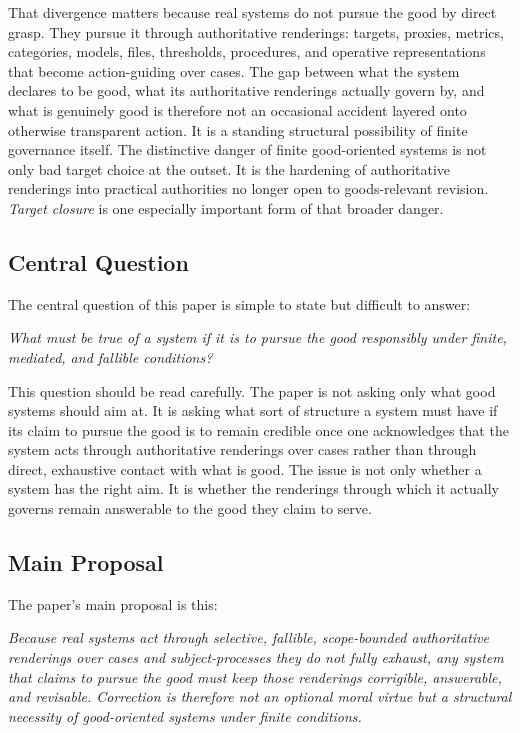 \documentclass[11pt]{article}
\renewenvironment{quote}
  {\list{}{\leftmargin=1.4em \rightmargin=1.0em}%
   \item\relax\color{softink}\itshape}
  {\endlist}
\renewcommand{\emph}[1]{\textit{#1}}
\begin{document}
That divergence matters because real systems do not pursue the good by direct grasp. They pursue it through authoritative renderings: targets, proxies, metrics, categories, models, files, thresholds, procedures, and operative representations that become action-guiding over cases. The gap between what the system declares to be good, what its authoritative renderings actually govern by, and what is genuinely good is therefore not an occasional accident layered onto otherwise transparent action. It is a standing structural possibility of finite governance itself. The distinctive danger of finite good-oriented systems is not only bad target choice at the outset. It is the hardening of authoritative renderings into practical authorities no longer open to goods-relevant revision. \emph{Target closure} is one especially important form of that broader danger.

\subsection{Central Question}

The central question of this paper is simple to state but difficult to answer:

\begin{quote}
What must be true of a system if it is to pursue the good responsibly under finite, mediated, and fallible conditions?
\end{quote}

This question should be read carefully. The paper is not asking only what good systems should aim at. It is asking what sort of structure a system must have if its claim to pursue the good is to remain credible once one acknowledges that the system acts through authoritative renderings over cases rather than through direct, exhaustive contact with what is good. The issue is not only whether a system has the right aim. It is whether the renderings through which it actually governs remain answerable to the good they claim to serve.

\subsection{Main Proposal}

The paper's main proposal is this:

\begin{quote}
Because real systems act through selective, fallible, scope-bounded authoritative renderings over cases and subject-processes they do not fully exhaust, any system that claims to pursue the good must keep those renderings corrigible, answerable, and revisable. Correction is therefore not an optional moral virtue but a structural necessity of good-oriented systems under finite conditions.
\end{quote}
\end{document}

